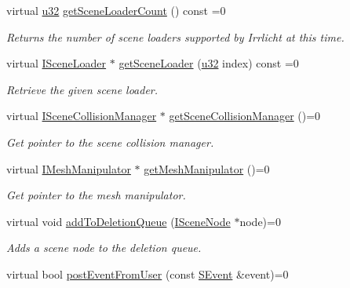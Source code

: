 \begin{DoxyCompactItemize}
virtual \hyperlink{namespaceirr_a0416a53257075833e7002efd0a18e804}{u32} \hyperlink{classirr_1_1scene_1_1ISceneManager_a3e5cd3e93d3ed711df7692c830c5a58a}{get\+Scene\+Loader\+Count} () const =0
\begin{DoxyCompactList}\small\item\em Returns the number of scene loaders supported by Irrlicht at this time. \end{DoxyCompactList}\item 
virtual \hyperlink{classirr_1_1scene_1_1ISceneLoader}{I\+Scene\+Loader} $\ast$ \hyperlink{classirr_1_1scene_1_1ISceneManager_a504fd792634ce0fbace4d13e70e4efab}{get\+Scene\+Loader} (\hyperlink{namespaceirr_a0416a53257075833e7002efd0a18e804}{u32} index) const =0
\begin{DoxyCompactList}\small\item\em Retrieve the given scene loader. \end{DoxyCompactList}\item 
virtual \hyperlink{classirr_1_1scene_1_1ISceneCollisionManager}{I\+Scene\+Collision\+Manager} $\ast$ \hyperlink{classirr_1_1scene_1_1ISceneManager_a433b65bfc974d069a1dc2fc296b23d9b}{get\+Scene\+Collision\+Manager} ()=0
\begin{DoxyCompactList}\small\item\em Get pointer to the scene collision manager. \end{DoxyCompactList}\item 
virtual \hyperlink{classirr_1_1scene_1_1IMeshManipulator}{I\+Mesh\+Manipulator} $\ast$ \hyperlink{classirr_1_1scene_1_1ISceneManager_a05138d6b5f99fced0061794fb5c42318}{get\+Mesh\+Manipulator} ()=0
\begin{DoxyCompactList}\small\item\em Get pointer to the mesh manipulator. \end{DoxyCompactList}\item 
virtual void \hyperlink{classirr_1_1scene_1_1ISceneManager_a11eac917a4c75c7a7730198d7bf31f5a}{add\+To\+Deletion\+Queue} (\hyperlink{classirr_1_1scene_1_1ISceneNode}{I\+Scene\+Node} $\ast$node)=0
\begin{DoxyCompactList}\small\item\em Adds a scene node to the deletion queue. \end{DoxyCompactList}\item 
virtual bool \hyperlink{classirr_1_1scene_1_1ISceneManager_ac68aa8d654884f19ad52fa28f11db424}{post\+Event\+From\+User} (const \hyperlink{structirr_1_1SEvent}{S\+Event} \&event)=0

\end{DoxyCompactItemize}
